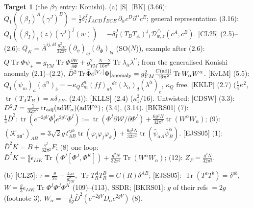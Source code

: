 \documentclass[11pt]{article}
\theoremstyle{definition}
\newtheorem{target}{Target}
\newcommand{\Tr}{\operatorname{Tr}}
\newcommand{\tr}{\operatorname{tr}}
\newcommand{\Sl}{\textup{[S]}}
\begin{document}
\begin{target}[the $\beta\gamma$ entry: Konishi]\label{t:konishi}
(a) \Sl\ [BK] (3.66): $Q_1((\beta_I)^A(\gamma^J)^B)=\tfrac12\delta^J_If_{ACD}f_{BCE}\,\partial_{\dot\alpha}c^D\partial^{\dot\alpha}c^E$; general representation (3.16): $Q_1((\beta_I)_i(z)(\gamma^J)^j(w))=-\delta^J_I(T_BT_A)^j{}_i\mathcal D^\triangle_{w,z}(c^A,c^B)$. [CL25] (2.5)--(2.6): $Q_K=\bar A^{ij,kl}\frac{g_{YM}^2}{32\pi^2}(\partial_\psi)_{ij}(\partial_{\bar\Phi})_{kl}$ (SO($N$)), example after (2.6): $Q\Tr\bar\Phi\psi_+=g_{YM}\Tr\bar\Phi\frac{\partial\bar W}{\partial\bar\Phi}+g_{YM}^2\frac{N-2}{16\pi^2}\Tr\bar\lambda_{\dot\alpha}\bar\lambda^{\dot\alpha}$; from the generalised Konishi anomaly (2.1)--(2.2), $\bar D^2\Tr\bar\Phi e^{[V,\cdot]}\Phi|_{\rm anomaly}=g_{YM}^2\frac{C({\rm adj})}{16\pi^2}\Tr W_\alpha W^\alpha$. [KvLM] (5.5): $Q_1(\psi_m)_a(\phi^n)_b=-\kappa_Q\delta^n_m(ff)_{ab}{}^{de}(\lambda_{\dot\alpha})_d(\lambda^{\dot\alpha})_e$, $\kappa_Q$ free. [KKLP] (2.7) ($\frac14\kappa^2$, $\tr(T_AT_B)=\kappa\delta_{AB}$, (2.4)); [KLLS] (2.4) ($\kappa_1^2/16$). Untwisted: [CDSW] (3.3): $\bar D^2J=\frac1{32\pi^2}\tr_{\rm adj}(\mathrm{ad}W_\alpha)(\mathrm{ad}W^\alpha)$; (3.4), (3.14). [BKRS01] (7): $\frac14\bar D^2:\tr(e^{-2gV}\Phi^\dagger_Ie^{2gV}\Phi^I):=\tr(\Phi^I\partial\mathcal W/\partial\Phi^I)+\frac{6g^2N}{32\pi^2}\tr(W^\alpha W_\alpha)$; (9): $(\mathcal K_{\mathbf{10}^*})_{AB}=3\sqrt2g\,t^{ijk}_{AB}\tr(\varphi_i\varphi_j\varphi_k)+\frac{6g^2N}{32\pi^2}\tr(\bar\psi_{\dot\alpha A}\bar\psi^{\dot\alpha}_B)$. [EJSS05] (1): $\bar D^2K=B+\frac{g^2}{32\pi^2}F$; (8) one loop: $\bar D^2K=\frac g6\epsilon_{IJK}\Tr(\Phi^I[\Phi^J,\Phi^K])+\frac{g^2N}{32\pi^2}\Tr(W^\alpha W_\alpha)$; (12): $Z_F=\frac{g^2N}{32\pi^2}$.

(b) [CL25]: $\tau=\frac\theta{2\pi}+\frac{4\pi i}{g_{YM}^2}$, $\Tr T_R^AT_R^B=C(R)\delta^{AB}$; [EJSS05]: $\Tr(T^aT^b)=\delta^{ab}$, $W=\frac g3\epsilon_{IJK}\Tr\Phi^I\Phi^J\Phi^K$ (109)--(113), SSDR; [BKRS01]: $g$ of their refs $=2g$ (footnote 3), $W_\alpha=-\frac1{8g}\bar D^2(e^{-2gV}D_\alpha e^{2gV})$ (8).


\end{target}
\end{document}
